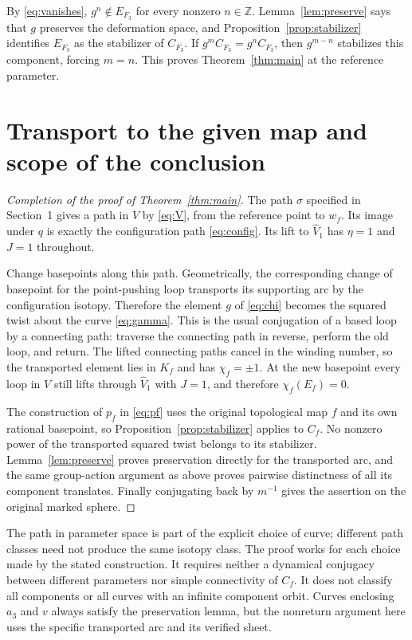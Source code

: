 \documentclass[11pt]{article}
\newcommand{\Z}{\mathbb Z}
\theoremstyle{remark}
\begin{document}
By \eqref{eq:vanishes}, $g^n\notin E_{F_3}$ for every nonzero $n\in\Z$. Lemma~\ref{lem:preserve} says that $g$ preserves the deformation space, and Proposition~\ref{prop:stabilizer} identifies $E_{F_3}$ as the stabilizer of $C_{F_3}$. If $g^mC_{F_3}=g^nC_{F_3}$, then $g^{m-n}$ stabilizes this component, forcing $m=n$. This proves Theorem~\ref{thm:main} at the reference parameter.

\section{Transport to the given map and scope of the conclusion}
\begin{proof}[Completion of the proof of Theorem~\ref{thm:main}]
The path $\sigma$ specified in Section~1 gives a path in $V$ by \eqref{eq:V}, from the reference point to $w_f$. Its image under $q$ is exactly the configuration path \eqref{eq:config}. Its lift to $\widehat V_1$ has $\eta=1$ and $J=1$ throughout.

Change basepoints along this path. Geometrically, the corresponding change of basepoint for the point-pushing loop transports its supporting arc by the configuration isotopy. Therefore the element $g$ of \eqref{eq:chi} becomes the squared twist about the curve \eqref{eq:gamma}. This is the usual conjugation of a based loop by a connecting path: traverse the connecting path in reverse, perform the old loop, and return. The lifted connecting paths cancel in the winding number, so the transported element lies in $K_f$ and has $\chi_f=\pm1$. At the new basepoint every loop in $V$ still lifts through $\widehat V_1$ with $J=1$, and therefore $\chi_f(E_f)=0$.

The construction of $p_f$ in \eqref{eq:pf} uses the original topological map $f$ and its own rational basepoint, so Proposition~\ref{prop:stabilizer} applies to $C_f$. No nonzero power of the transported squared twist belongs to its stabilizer. Lemma~\ref{lem:preserve} proves preservation directly for the transported arc, and the same group-action argument as above proves pairwise distinctness of all its component translates. Finally conjugating back by $m^{-1}$ gives the assertion on the original marked sphere.
\end{proof}

The path in parameter space is part of the explicit choice of curve; different path classes need not produce the same isotopy class. The proof works for each choice made by the stated construction. It requires neither a dynamical conjugacy between different parameters nor simple connectivity of $C_f$. It does not classify all components or all curves with an infinite component orbit. Curves enclosing $a_3$ and $v$ always satisfy the preservation lemma, but the nonreturn argument here uses the specific transported arc and its verified sheet.
\end{document}
